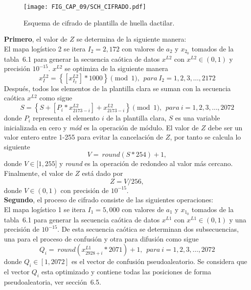 \begin{figure}[!htbp] %
	\center
	\texttt{[image: FIG\_CAP\_09/SCH\_CIFRADO.pdf]} 
	\caption{Esquema de cifrado de plantilla de huella dactilar.}
\end{figure}

\textbf{Primero}, el valor de $Z$ se determina de la siguiente manera:  \\

El mapa logístico 2 se itera $I_{2}=2,172$ con valores de $a_{2}$ y $x_{2_{0}}$ tomados de la tabla~6.1 para generar la secuencia caótica de datos $x^{L2}$ con $x^{L2}\in (0,1)$ y precisión $10^{-15}$. $x^{L2}$ se optimiza de la siguiente manera
\begin{equation}
x_{I}^{L2}=\left\lbrace \left[x_{I_{2}}^{L2}\right]\ast 1000\right\rbrace \pmod 1, ~~ para ~I_{2}=1,2,3,\ldots ,2172 
\end{equation}   
Después, todos los elementos de la plantilla clara se suman con la secuencia caótica $x^{L2}$ como sigue
\begin{equation}
S=\left\lbrace S+[P_{i}\ast x_{2173-i}^{L2}]+x_{2173-i}^{L2}\right\rbrace \pmod 1, ~~ para ~i=1,2,3,\ldots ,2072
\end{equation}
donde $P_{i}$ representa el elemento $i$ de la plantilla clara, $S$ es una variable inicializada en cero y \textit{mód} es la operación de módulo. El valor de $Z$ debe ser un valor entero entre 1-255 para evitar la cancelación de $Z$, por tanto se calcula lo siguiente
\begin{equation}
V=~round(S\ast 254)+1,
\end{equation}
donde $V\in \lbrack 1,255]$ y \textit{round} es la operación de redondeo al valor más cercano. Finalmente, el valor de $Z$ está dado por
\begin{equation}
Z=V/256,
\end{equation}
donde $V\in (0,1)$ con precisión de $10^{-15}$.  \\

\textbf{Segundo}, el proceso de cifrado consiste de las siguientes operaciones:   \\

El mapa logístico 1 se itera $I_{1}=5,000$ con valores de $a_{1}$ y $x_{1_{0}}$ tomados de la tabla~6.1 para generar la secuencia caótica de datos $x^{L1}$ con $x^{L1}\in(0,1)$ y una precisión de $10^{-15}$. De esta secuencia caótica se determinan dos subsecuencias, una para el proceso de confusión y otra para difusión como sigue
\begin{equation}
Q_{i}=~round\left(x_{2928+i}^{L1}\ast 2071\right)+1, ~~ para ~i=1,2,3,\ldots,2072
\end{equation}
donde $Q_{i}\in \left[1,2072\right]$ es el vector de confusión pseudoaleatorio. Se considera que el vector $Q_{i}$ esta optimizado y contiene todas las posiciones de forma pseudoaleatoria, ver sección~6.5. \\

